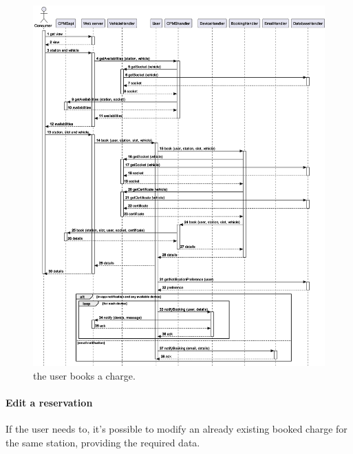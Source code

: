 \begin{figure}[h!]
    \centering
    \includegraphics[width=\columnwidth]{./images/sequences/emsp/book_add}
    \caption{the user books a charge.}
\end{figure}

\pagebreak

\paragraph{Edit a reservation} If the user needs to, it's possible to modify an already existing booked charge for the same station, providing the required data.

